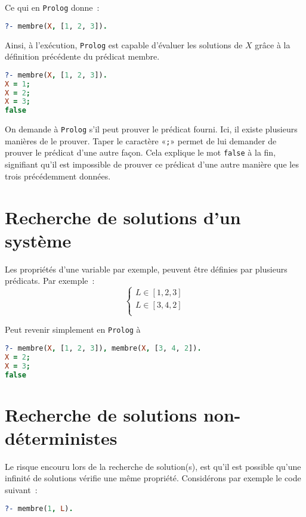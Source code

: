 Ce qui en \texttt{Prolog} donne~:
\begin{lstlisting}[language=Prolog,frame=single]
?- membre(X, [1, 2, 3]).
\end{lstlisting}

Ainsi, à l'exécution, \texttt{Prolog} est capable d'évaluer les solutions de $X$ grâce à
la définition précédente du prédicat membre.

\begin{lstlisting}[language=Prolog,frame=single]
?- membre(X, [1, 2, 3]).
X = 1;
X = 2;
X = 3;
false
\end{lstlisting}

On demande à \texttt{Prolog} s'il peut prouver le prédicat fourni. Ici, il existe plusieurs manières de le prouver. Taper le caractère «\texttt{;}» permet de lui demander de prouver le prédicat d'une autre façon. Cela explique le mot \texttt{false} à la fin, signifiant qu'il est impossible de prouver ce prédicat d'une autre manière que les trois précédemment données.


\section{Recherche de solutions d'un système}

Les propriétés d'une variable par exemple, peuvent être définies par plusieurs prédicats. Par exemple~:
\[
    \left\{  
    \begin{array}{c}
        L \in [1, 2, 3]\\
        L \in [3, 4, 2]\\
    \end{array}
    \right .
\]

Peut revenir simplement en \texttt{Prolog} à
\begin{lstlisting}[language=Prolog,frame=single]
?- membre(X, [1, 2, 3]), membre(X, [3, 4, 2]).
X = 2;
X = 3;
false
\end{lstlisting}


\section{Recherche de solutions non-déterministes}

Le risque encouru lors de la recherche de solution(s), est qu'il est possible qu'une
infinité de solutions vérifie une même propriété. Considérons par exemple
le code suivant~:

\begin{lstlisting}[language=Prolog,frame=single]
?- membre(1, L).
\end{lstlisting}

